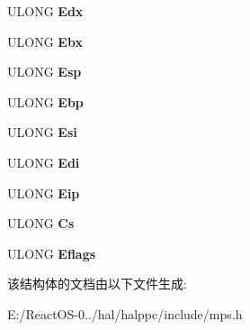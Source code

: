 \begin{DoxyCompactItemize}
U\+L\+O\+NG {\bfseries Edx}
\item 
\mbox{\label{struct___k_i_r_q___t_r_a_p_f_r_a_m_e_ab3aaec42cceadf9e9197d8b09506e4ab}} 
U\+L\+O\+NG {\bfseries Ebx}
\item 
\mbox{\label{struct___k_i_r_q___t_r_a_p_f_r_a_m_e_ab26b8b15d15072ba3ec4a685b0a4b0be}} 
U\+L\+O\+NG {\bfseries Esp}
\item 
\mbox{\label{struct___k_i_r_q___t_r_a_p_f_r_a_m_e_a786309a6f7328e394382b48ac8079d6d}} 
U\+L\+O\+NG {\bfseries Ebp}
\item 
\mbox{\label{struct___k_i_r_q___t_r_a_p_f_r_a_m_e_aa64d31a610ea1212ef405ab0b65b4e6a}} 
U\+L\+O\+NG {\bfseries Esi}
\item 
\mbox{\label{struct___k_i_r_q___t_r_a_p_f_r_a_m_e_ac7b3c55c229d821efea9c23a7c622172}} 
U\+L\+O\+NG {\bfseries Edi}
\item 
\mbox{\label{struct___k_i_r_q___t_r_a_p_f_r_a_m_e_a08cbae05f38194a6c2a1af0208d007bf}} 
U\+L\+O\+NG {\bfseries Eip}
\item 
\mbox{\label{struct___k_i_r_q___t_r_a_p_f_r_a_m_e_a76fee36facbc6bdde94ba6153b8d6802}} 
U\+L\+O\+NG {\bfseries Cs}
\item 
\mbox{\label{struct___k_i_r_q___t_r_a_p_f_r_a_m_e_aa785e20cc1fb63677205636d337d84a5}} 
U\+L\+O\+NG {\bfseries Eflags}
\end{DoxyCompactItemize}


该结构体的文档由以下文件生成\+:\begin{DoxyCompactItemize}
\item 
E\+:/\+React\+O\+S-\/0../hal/halppc/include/mps.\+h\end{DoxyCompactItemize}
